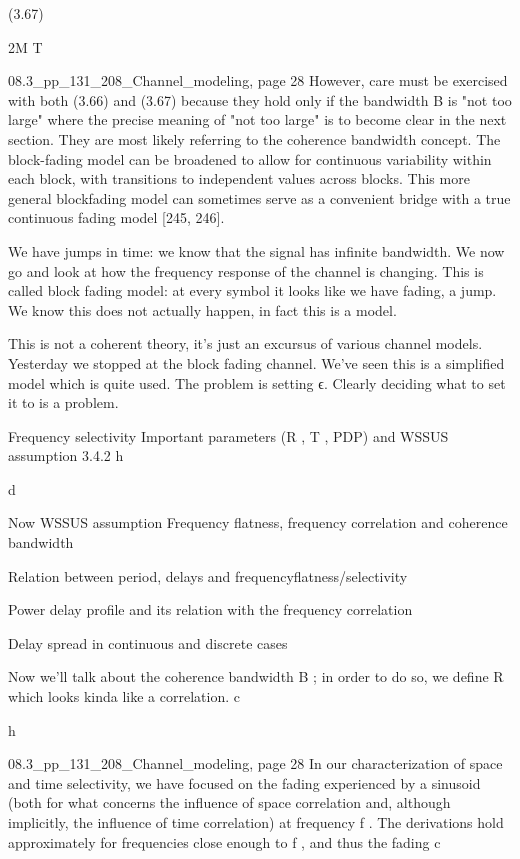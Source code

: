 {{{{(3.67)

2\nu M T

08.3_pp_131_208_Channel_modeling, page 28 However, care must be exercised with both (3.66) and (3.67) because they hold only if the bandwidth B is "not too large" where the precise meaning of "not too large" is to become clear in the next section.
They are most likely referring to the coherence bandwidth concept.
The block-fading model can be broadened to allow for continuous variability within each block, with transitions to independent values across blocks. This more general blockfading model can sometimes serve as a convenient bridge with a true continuous fading model [245, 246].

We have jumps in time: we know that the signal has infinite bandwidth.
We now go and look at how the frequency response of the channel is changing.
This is called block fading model: at every symbol it looks like we have fading, a jump.
We know this does not actually happen, in fact this is a model.

This is not a coherent theory, it's just an excursus of various channel models.
Yesterday we stopped at the block fading channel. We've seen this is a simplified model which is quite used. The problem is setting ϵ.
Clearly deciding what to set it to is a problem.

Frequency selectivity Important parameters (R , T , PDP) and WSSUS assumption
{3.4.2}
h

d

Now WSSUS assumption Frequency flatness,
frequency correlation and coherence bandwidth

Relation between period, delays and frequencyflatness/selectivity

Power delay profile and its relation with the frequency correlation

Delay spread in continuous and discrete cases

Now we'll talk about the coherence bandwidth B ; in order to do so, we define R which looks kinda like a correlation.
c

h

08.3_pp_131_208_Channel_modeling, page 28 In our characterization of space and time selectivity, we have focused on the fading experienced by a sinusoid (both for what concerns the influence of space correlation and, although implicitly, the influence of time correlation) at frequency f . The derivations hold approximately for frequencies close enough to f , and thus the fading c

}}}}

